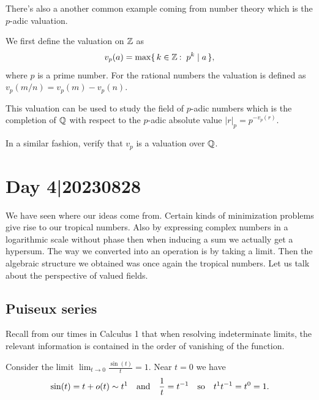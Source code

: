 \documentclass[12pt]{memoir}
\begin{document}
There's also a another common example coming from number theory which is the $p$-adic valuation. 

\begin{Ex}
    We first define the valuation on $\mathbb{Z}$ as 
    $$v_p(a)=\max\set{k\in\bZ\:\ p^k\mid a},$$
    where $p$ is a prime number. For the rational numbers the valuation is defined as $v_p(m/n)=v_p(m)-v_p(n)$.
\end{Ex}

This valuation can be used to study the field of $p$-adic numbers which is the completion of $\mathbb{Q}$ with respect to the $p$-adic absolute value $|r|_p=p^{-v_p(r)}$.

\begin{Ej}[1]
In a similar fashion, verify that $v_p$ is a valuation over $\mathbb{Q}$.
\end{Ej}


\section{Day 4|20230828}

We have seen where our ideas come from. Certain kinds of minimization problems give rise to our tropical numbers. Also by expressing complex numbers in a logarithmic scale without phase then when inducing a sum we actually get a hypersum. The way we converted into an operation is by taking a limit. Then the algebraic structure we obtained was once again the tropical numbers. Let us talk about the perspective of valued fields.
\subsection{Puiseux series}
Recall from our times in Calculus 1 that when resolving indeterminate limits, the relevant information is contained in the order of vanishing of the function.

\begin{Ex}
    Consider the limit $\lim_{t\to 0}\frac{\sin(t)}{t}=1$. Near $t=0$ we have 
    $$\sin(t)=t+o(t)\sim t^1\quad\text{and}\quad\frac{1}{t}=t^{-1}\quad\text{so}\quad t^1t^{-1}=t^0=1.$$
\end{Ex}
\end{document}
